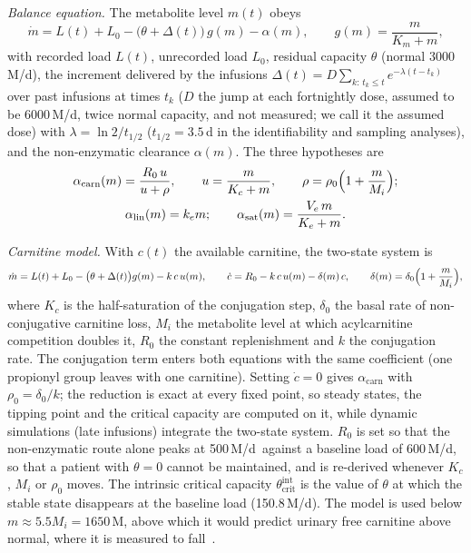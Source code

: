 \documentclass[11pt]{article}
\newcommand{\um}{\,\textmu M/d}
\newcommand{\thci}{\theta_{\mathrm{crit}}^{\mathrm{int}}}
\begin{document}
\emph{Balance equation.} The metabolite level $m(t)$ obeys
\begin{equation}
\label{eq:balance}
\dot m = L(t) + L_0 - \bigl(\theta+\Delta(t)\bigr)\,g(m) - \alpha(m),
\qquad g(m)=\frac{m}{K_m+m},
\end{equation}
with recorded load $L(t)$, unrecorded load $L_0$, residual capacity $\theta$ (normal
3000\um), the increment delivered by the infusions
$\Delta(t)=D\sum_{k:\,t_k\le t} e^{-\lambda(t-t_k)}$ over past infusions at times $t_k$ ($D$ the
jump at each fortnightly dose, assumed to be 6000\um, twice normal capacity, and not measured; we
call it the assumed dose) with $\lambda=\ln2/t_{1/2}$ ($t_{1/2}=3.5$\,d in the identifiability and
sampling analyses), and the non-enzymatic clearance $\alpha(m)$. The three hypotheses are
\begin{gather}
\alpha_{\mathrm{carn}}(m)=\frac{R_0\,u}{u+\rho},\qquad
u=\frac{m}{K_c+m},\qquad\rho=\rho_0\Bigl(1+\frac{m}{M_i}\Bigr);\\
\alpha_{\mathrm{lin}}(m)=k_e m;\qquad
\alpha_{\mathrm{sat}}(m)=\frac{V_e\,m}{K_e+m}.
\end{gather}

\emph{Carnitine model.} With $c(t)$ the available carnitine, the two-state system is
\begin{equation}
\label{eq:carn}
\dot m = L(t)+L_0-\bigl(\theta+\Delta(t)\bigr)g(m)-k\,c\,u(m),\qquad
\dot c = R_0-k\,c\,u(m)-\delta(m)\,c,\qquad \delta(m)=\delta_0\Bigl(1+\frac{m}{M_i}\Bigr),
\end{equation}
where $K_c$ is the half-saturation of the conjugation step, $\delta_0$ the basal rate of
non-conjugative carnitine loss, $M_i$ the metabolite level at which acylcarnitine competition
doubles it, $R_0$ the constant replenishment and $k$ the conjugation rate. The conjugation term
enters both equations with the same coefficient (one propionyl group leaves with one carnitine).
Setting $\dot c=0$ gives $\alpha_{\mathrm{carn}}$ with $\rho_0=\delta_0/k$; the reduction is exact
at every fixed point, so steady states, the tipping point and the critical capacity are computed
on it, while dynamic simulations (late infusions) integrate the two-state system. $R_0$ is set
so that the non-enzymatic route alone peaks at 500\um\ against a baseline load of 600\um, so that
a patient with $\theta=0$ cannot be maintained, and is re-derived whenever $K_c$, $M_i$ or
$\rho_0$ moves. The intrinsic critical capacity $\thci$ is the value of $\theta$ at which the
stable state disappears at the baseline load (150.8\um). The model is used below $m\approx5.5M_i=1650$\,\textmu M, above which it would predict urinary free
carnitine above normal, where it is measured to fall~\cite{carnitine_pa_child,carnitine_excretion_pa}.
\end{document}
